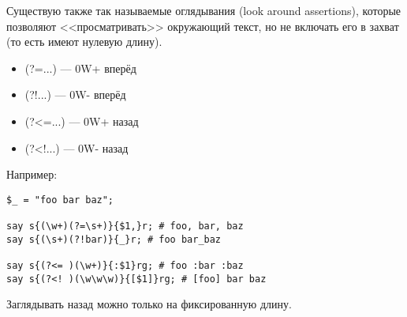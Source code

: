 Существую также так называемые оглядывания (look around assertions), которые позволяют <<просматривать>> окружающий текст, но не включать его в захват (то есть имеют нулевую длину).
\begin{itemize}[nosep]
  \item (?=...) --- 0W+ вперёд
  \item (?!...) --- 0W- вперёд
  \item (?<=...) --- 0W+ назад
  \item (?<!...) --- 0W- назад
\end{itemize}
Например:
\begin{verbatim}
$_ = "foo bar baz";

say s{(\w+)(?=\s+)}{$1,}r; # foo, bar, baz
say s{(\s+)(?!bar)}{_}r; # foo bar_baz

say s{(?<= )(\w+)}{:$1}rg; # foo :bar :baz
say s{(?<! )(\w\w\w)}{[$1]}rg; # [foo] bar baz
\end{verbatim}
Заглядывать назад можно только на фиксированную длину.

